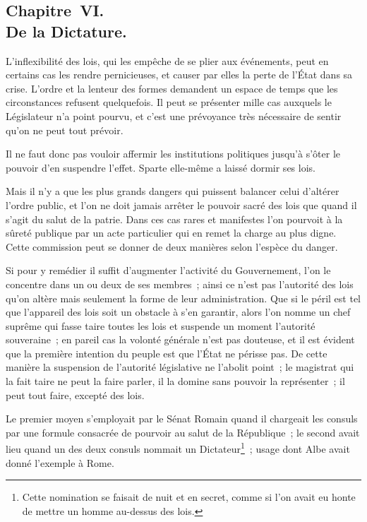\documentclass[french,twoside]{book} %
\begin{document}
\subsection[{Chapitre VI. De la Dictature.}]{Chapitre VI. \\
De la Dictature.}
\noindent L’inflexibilité des lois, qui les empêche de se plier aux événements, peut en certains cas les rendre pernicieuses, et causer par elles la perte de l’État dans sa crise. L’ordre et la lenteur des formes demandent un espace de temps que les circonstances refusent quelquefois. Il peut se présenter mille cas auxquels le Législateur n’a point pourvu, et c’est une prévoyance très nécessaire de sentir qu’on ne peut tout prévoir.\par
Il ne faut donc pas vouloir affermir les institutions politiques jusqu’à s’ôter le pouvoir d’en suspendre l’effet. Sparte elle-même a laissé dormir ses lois.\par
Mais il n’y a que les plus grands dangers qui puissent balancer celui d’altérer l’ordre public, et l’on ne doit jamais arrêter le pouvoir sacré des lois que quand il s’agit du salut de la patrie. Dans ces cas rares et manifestes l’on pourvoit à la sûreté publique par un acte particulier qui en remet la charge au plus digne. Cette commission peut se donner de deux manières selon l’espèce du danger.\par
Si pour y remédier il suffit d’augmenter l’activité du Gouvernement, l’on le concentre dans un ou deux de ses membres ; ainsi ce n’est pas l’autorité des lois qu’on altère mais seulement la forme de leur administration. Que si le péril est tel que l’appareil des lois soit un obstacle à s’en garantir, alors l’on nomme un chef suprême qui fasse taire toutes les lois et suspende un moment l’autorité souveraine ; en pareil cas la volonté générale n’est pas douteuse, et il est évident que la première intention du peuple est que l’État ne périsse pas. De cette manière la suspension de l’autorité législative ne l’abolit point ; le magistrat qui la fait taire ne peut la faire parler, il la domine sans pouvoir la représenter ; il peut tout faire, excepté des lois.\par
Le premier moyen s’employait par le Sénat Romain quand il chargeait les consuls par une formule consacrée de pourvoir au salut de la République ; le second avait lieu quand un des deux consuls nommait un Dictateur\footnote{Cette nomination se faisait de nuit et en secret, comme si l’on avait eu honte de mettre un homme au-dessus des lois.} ; usage dont Albe avait donné l’exemple à Rome.\par
\end{document}
